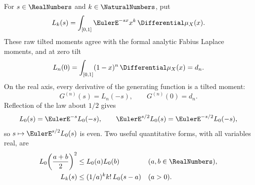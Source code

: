 \documentclass[11pt,oneside]{article}
\theoremstyle{definition}
\theoremstyle{remark}
\begin{document}
For \(s\in\RealNumbers\) and \(k\in\NaturalNumbers\), put
\begin{equation}
 L_k(s)=\int_{[0,1]}\EulerE^{-sx}x^k\,\Differential\mu_X(x).              \label{eq:raw-laplace-moment}
\end{equation}
These raw tilted moments agree with the formal analytic Fabius Laplace moments, and at zero
tilt
\begin{equation}
 L_n(0)=\int_{[0,1]}(1-x)^n\,\Differential\mu_X(x)=d_n.              \label{eq:probability-half-moment}
\end{equation}
On the real axis, every derivative of the generating function is a tilted moment:
\begin{equation}
 G^{(n)}(s)=L_n(-s),\qquad G^{(n)}(0)=d_n.                  \label{eq:G-derivative-laplace}
\end{equation}
Reflection of the law about \(1/2\) gives
\begin{equation}
 L_0(s)=\EulerE^{-s}L_0(-s),\qquad
 \EulerE^{s/2}L_0(s)=\EulerE^{-s/2}L_0(-s),                          \label{eq:laplace-reflection}
\end{equation}
so \(s\mapsto\EulerE^{s/2}L_0(s)\) is even.  Two useful quantitative forms, with all
variables real, are
\begin{align}
 L_0\!\left(\frac{a+b}{2}\right)^2
   &\le L_0(a)L_0(b) &&(a,b\in\RealNumbers),                         \label{eq:laplace-midpoint}\\
 L_k(s)&\le (1/a)^k k!\,L_0(s-a) &&(a>0).                 \label{eq:laplace-shift}
\end{align}
\end{document}

